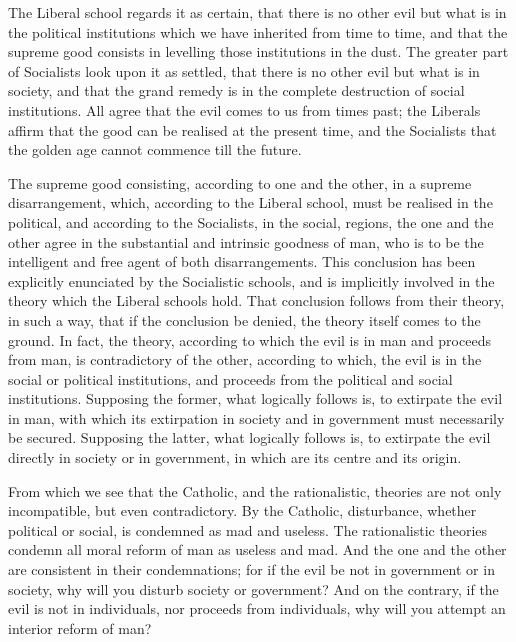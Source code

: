 \begin{quotationx}
The Liberal school regards it as certain, that there is no other evil but what is in the political institutions which we have inherited from time to time, and that the supreme good consists in levelling those institutions in the dust. The greater part of Socialists look upon it as settled, that there is no other evil but what is in society, and that the grand remedy is in the complete destruction of social institutions. All agree that the evil comes to us from times past; the Liberals affirm that the good can be realised at the present time, and the Socialists that the golden age cannot commence till the future.

The supreme good consisting, according to one and the other, in a supreme disarrangement, which, according to the Liberal school, must be realised in the political, and according to the Socialists, in the social, regions, the one and the other agree in the substantial and intrinsic goodness of man, who is to be the intelligent and free agent of both disarrangements. This conclusion has been explicitly enunciated by the Socialistic schools, and is implicitly involved in the theory which the Liberal schools hold. That conclusion follows from their theory, in such a way, that if the conclusion be denied, the theory itself comes to the ground. In fact, the theory, according to which the evil is in man and proceeds from man, is contradictory of the other, according to which, the evil is in the social or political institutions, and proceeds from the political and social institutions. Supposing the former, what logically follows is, to extirpate the evil in man, with which its extirpation in society and in government must necessarily be secured. Supposing the latter, what logically follows is, to extirpate the evil directly in society or in government, in which are its centre and its origin.

From which we see that the Catholic, and the rationalistic, theories are not only incompatible, but even contradictory. By the Catholic, disturbance, whether political or social, is condemned as mad and useless. The rationalistic theories condemn all moral reform of man as useless and mad. And the one and the other are consistent in their condemnations; for if the evil be not in government or in society, why will you disturb society or government? And on the contrary, if the evil is not in individuals, nor proceeds from individuals, why will you attempt an interior reform of man?
\end{quotationx}


